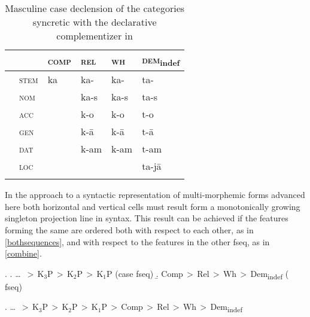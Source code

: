 \begin{table}
\caption{Masculine case declension of the categories syncretic with the declarative complementizer in }
\label{2D:Lat}
\begin{tabular}[h]{ l l l l l l }
 \lsptoprule
		& 			& \textsc{comp} & \textsc{rel} 	& \textsc{wh}  	& \textsc{dem}\textsubscript{indef}\\
\midrule	
	& \textsc{stem}	& ka\cellcolor[gray]{0.95}		& ka-\cellcolor[gray]{0.95}	& ka-\cellcolor[gray]{0.95}	& ta-\\
		& \textsc{nom}	& 			 & ka-s\cellcolor[gray]{0.90}	& ka-s\cellcolor[gray]{0.90}	& ta-s\\
 		& \textsc{acc}	&			 & k-o\cellcolor[gray]{0.80}	& k-o\cellcolor[gray]{0.80}		& t-o\\
		& \textsc{gen}	&	& k-\={a}\cellcolor[gray]{0.75}& k-\={a}\cellcolor[gray]{0.75} 
																	& t-\={a}\\	
		& \textsc{dat}	&			 & k-am\cellcolor[gray]{0.7}	& k-am\cellcolor[gray]{0.7}	& t-am\\
		& \textsc{loc}	&			 & 						& 		& ta-j\={a}\\
\lspbottomrule
\end{tabular}
\end{table}

In the approach to a syntactic representation of multi-morphemic forms advanced here both horizontal and vertical cells must result form a monotonically growing singleton projection line in syntax. This result can be achieved if the features forming the same  are ordered both with respect to each other, as in \ref{bothsequences}, and with respect to the features in the other fseq, as in \ref{combine}.

\ex.\label{bothsequences} 
\a.\label{ver} \ldots \ $>$\,K$_{3}$P\,$>$\,K$_{2}$P\,$>$\,K$_{1}$P \hfill (case fseq) 
\b.\label{hor} Comp\,$>$\,Rel\,$>$\,Wh\,$>$\,Dem\textsubscript{indef}  \hfill ( fseq)

\ex.\label{combine} \ldots \ $>$\,K$_{3}$P\,$>$\,K$_{2}$P\,$>$\,K$_{1}$P\,$>$\,Comp\,$>$\,Rel\,$>$\,Wh\,$>$\,Dem\textsubscript{indef}

